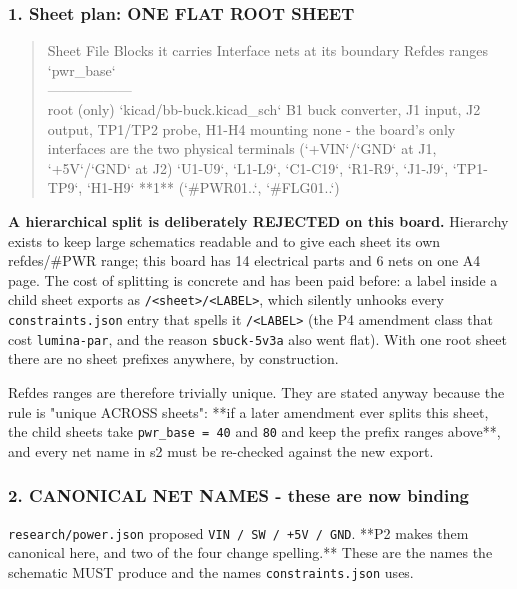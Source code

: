 \documentclass[11pt,a4paper]{article}
\begin{document}
\subsubsection*{1. Sheet plan: ONE FLAT ROOT SHEET}
\begin{quote}\small\ttfamily\raggedright
\textbar{} Sheet \textbar{} File \textbar{} Blocks it carries \textbar{} Interface nets at its boundary \textbar{} Refdes ranges \textbar{} `pwr\_base` \textbar{}\\
\textbar{}---\textbar{}---\textbar{}---\textbar{}---\textbar{}---\textbar{}---\textbar{}\\
\textbar{} root (only) \textbar{} `kicad/bb-buck.kicad\_sch` \textbar{} B1 buck converter, J1 input, J2 output, TP1/TP2 probe, H1-H4 mounting \textbar{} none - the board's only interfaces are the two physical terminals (`+VIN`/`GND` at J1, `+5V`/`GND` at J2) \textbar{} `U1-U9`, `L1-L9`, `C1-C19`, `R1-R9`, `J1-J9`, `TP1-TP9`, `H1-H9` \textbar{} {*}{*}1{*}{*} (`\#PWR01..`, `\#FLG01..`) \textbar{}
\end{quote}
\textbf{A hierarchical split is deliberately REJECTED on this board.} Hierarchy exists to keep large schematics readable and to give each sheet its own refdes/\#PWR range; this board has 14 electrical parts and 6 nets on one A4 page. The cost of splitting is concrete and has been paid before: a label inside a child sheet exports as \texttt{/\textless{}sheet\textgreater{}/\textless{}LABEL\textgreater{}}, which silently unhooks every \texttt{constraints.json} entry that spells it \texttt{/\textless{}LABEL\textgreater{}} (the P4 amendment class that cost \texttt{lumina-par}, and the reason \texttt{sbuck-5v3a} also went flat). With one root sheet there are no sheet prefixes anywhere, by construction.

Refdes ranges are therefore trivially unique. They are stated anyway because the rule is "unique ACROSS sheets": {*}{*}if a later amendment ever splits this sheet, the child sheets take \texttt{pwr\_base = 40} and \texttt{80} and keep the prefix ranges above{*}{*}, and every net name in s2 must be re-checked against the new export.

\subsubsection*{2. CANONICAL NET NAMES - these are now binding}
\texttt{research/power.json} proposed \texttt{VIN / SW / +5V / GND}. {*}{*}P2 makes them canonical here, and two of the four change spelling.{*}{*} These are the names the schematic MUST produce and the names \texttt{constraints.json} uses.
\end{document}
